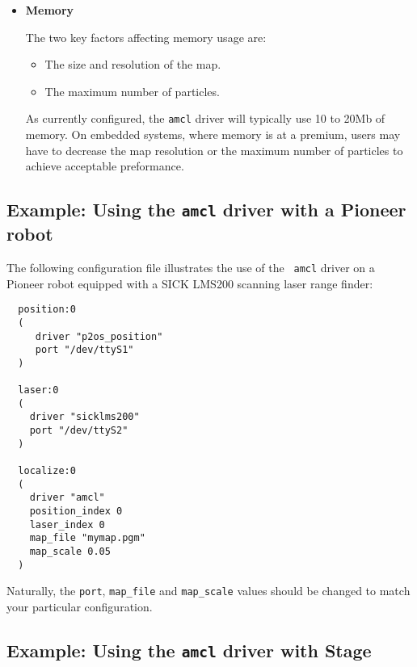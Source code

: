 \begin{itemize}
\item {\bf Memory}

The two key factors affecting memory usage are:
  \begin{itemize}
  \item The size and resolution of the map.
  \item The maximum number of particles.
  \end{itemize}
As currently configured, the {\tt amcl} driver will typically use 10
to 20Mb of memory.  On embedded systems, where memory is at a premium,
users may have to decrease the map resolution or the maximum number of
particles to achieve acceptable preformance.


\end{itemize}




\subsection*{Example: Using the {\tt amcl} driver with a Pioneer robot}

The following configuration file illustrates the use of the {\tt
amcl} driver on a Pioneer robot equipped with a SICK LMS200
scanning laser range finder:
  \begin{small}
  \begin{verbatim}
  position:0 
  (
     driver "p2os_position" 
     port "/dev/ttyS1"
  )
  
  laser:0 
  (
    driver "sicklms200" 
    port "/dev/ttyS2"
  )

  localize:0 
  (
    driver "amcl"
    position_index 0
    laser_index 0
    map_file "mymap.pgm"
    map_scale 0.05
  )
  \end{verbatim}
  \end{small}
Naturally, the {\tt port}, {\tt map\_file} and {\tt map\_scale} values
should be changed to match your particular configuration.


\subsection*{Example: Using the {\tt amcl} driver with Stage}

